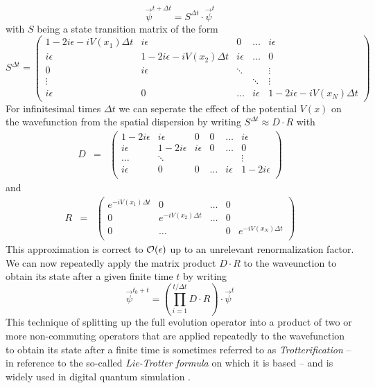 %
\begin{equation}
\vec{\psi}^{t+\Delta t} = S^{\Delta t}  \cdot \vec{\psi}^t
\end{equation}
%
with $S$ being a state transition matrix of the form
%
\begin{equation}
S^{\Delta t} = \left(
	\begin{array}{ccccc}
		1-2i\epsilon-iV(x_1)\Delta t & i\epsilon & 0 & \hdots &  i\epsilon \\
		i \epsilon & 1-2i\epsilon -iV(x_2)\Delta t & i\epsilon & \hdots & 0 \\
		0 & i\epsilon & \ddots & & \vdots \\
		\vdots & & & \ddots  & \vdots \\
		i \epsilon & 0 & \hdots & i\epsilon & 1 - 2i\epsilon -iV(x_N)\Delta t
	\end{array}
 \right) \label{eq:grover_iteration_matrix}
\end{equation}
%
For infinitesimal times $\Delta t$ we can seperate the effect of the potential $V(x)$ on the wavefunction from the spatial dispersion by writing $S^{\Delta t} \approx D\cdot R$ with 
%
\begin{eqnarray}
D & = & \left( 
		\begin{array}{cccccc}
		1-2i \epsilon & i\epsilon & 0 & 0 & \hdots & i\epsilon \\
		i \epsilon & 1 - 2i \epsilon & i \epsilon & 0 & \hdots & 0 \\
		\hdots & \ddots & & & & \vdots \\
		i \epsilon & 0 & 0 &  \hdots & i\epsilon & 1-2i \epsilon \\
		\end{array}
	\right)
\end{eqnarray}
%
and 
%
\begin{eqnarray}
R & = & \left( \begin{array}{ccccc}
	e^{-i V(x_1) \Delta t} & 0 & \hdots & 0 \\
	0 & e^{-i V (x_2) \Delta t} & \hdots & 0 \\
	0 & \hdots & & 0 & e^{-i V (x_N) \Delta t} \\
	\end{array}
	\right)
\end{eqnarray}
%
This approximation is correct to $\begin{mathcal}O\end{mathcal}(\epsilon)$ up to an unrelevant renormalization factor. We can now repeatedly apply the matrix product $D\cdot R$ to the waveunction to obtain its state after a given finite time $t$ by writing
%
\begin{equation}
\vec{\psi}^{t_0+t} = \left(\prod\limits_{i = 1}^{t/\Delta t} D\cdot R\right)\cdot \vec{\psi}^{t} \label{eq:trotter_evolution}
\end{equation}
%
This technique of splitting up the full evolution operator into a product of two or more non-commuting operators that are applied repeatedly to the wavefunction to obtain its state after a finite time is sometimes referred to as {\it Trotterification} -- in reference to the so-called {\it Lie-Trotter formula} on which it is based -- and is widely used in digital quantum simulation \citep{lloyd_universal_1996,lanyon_universal_2011}.

